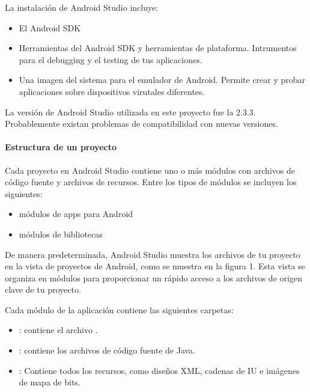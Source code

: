 La instalación de Android Studio incluye:
\begin{itemize}
\item {} 
El Android SDK

\item {} 
Herramientas del Android SDK y herramientas de plataforma. Intrumentos para el debugging y el testing de tus aplicaciones.

\item {} 
Una imagen del sistema para el emulador de Android. Permite crear y probar aplicaciones sobre dispositivos virutales diferentes.

\end{itemize}

La versión de Android Studio utilizada en este proyecto fue la 2.3.3. Probablemente
existan problemas de compatibilidad con nuevas versiones.


\paragraph{Estructura de un proyecto}
\label{\detokenize{dev_docs:estructura-de-un-proyecto}}
Cada proyecto en Android Studio contiene uno o más módulos con archivos de código fuente y archivos de recursos. Entre los tipos de módulos se incluyen los siguientes:
\begin{itemize}
\item {} 
módulos de apps para Android

\item {} 
módulos de bibliotecas


\end{itemize}

De manera predeterminada, Android Studio muestra los archivos de tu proyecto en la vista de proyectos de Android, como se muestra en la figura 1. Esta vista se organiza en módulos para proporcionar un rápido acceso a los archivos de origen clave de tu proyecto.

Cada módulo de la aplicación contiene las siguientes carpetas:
\begin{itemize}
\item {} 
: contiene el archivo .

\item {} 
: contiene los archivos de código fuente de Java.

\item {} 
: Contiene todos los recursos, como diseños XML, cadenas de IU e imágenes de mapa de bits.

\end{itemize}



